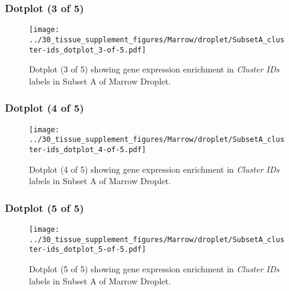 \clearpage

\subsubsection{Dotplot (3 of 5)}
\begin{figure}[h]
\centering
\texttt{[image: ../30\_tissue\_supplement\_figures/Marrow/droplet/SubsetA\_cluster-ids\_dotplot\_3-of-5.pdf]}

\caption{ Dotplot (3 of 5)  showing gene expression enrichment in \emph{Cluster IDs} labels in Subset A of Marrow Droplet. }
\end{figure}


\clearpage

\subsubsection{Dotplot (4 of 5)}
\begin{figure}[h]
\centering
\texttt{[image: ../30\_tissue\_supplement\_figures/Marrow/droplet/SubsetA\_cluster-ids\_dotplot\_4-of-5.pdf]}

\caption{ Dotplot (4 of 5)  showing gene expression enrichment in \emph{Cluster IDs} labels in Subset A of Marrow Droplet. }
\end{figure}


\clearpage

\subsubsection{Dotplot (5 of 5)}
\begin{figure}[h]
\centering
\texttt{[image: ../30\_tissue\_supplement\_figures/Marrow/droplet/SubsetA\_cluster-ids\_dotplot\_5-of-5.pdf]}

\caption{ Dotplot (5 of 5)  showing gene expression enrichment in \emph{Cluster IDs} labels in Subset A of Marrow Droplet. }
\end{figure}

